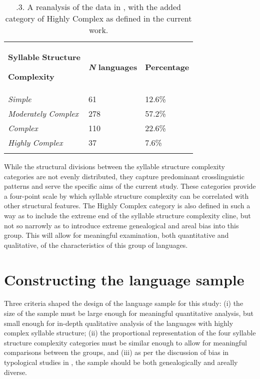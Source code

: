 \begin{table}
\begin{tabularx}{\textwidth}{XXX}
\lsptoprule

\textbf{Syllable} \textbf{Structure} 

\textbf{Complexity} & \textbf{\textit{N}} \textbf{languages} & \textbf{Percentage}\\
\textit{Simple} & 61 & 12.6\%\\
\textit{Moderately} \textit{Complex} & 278 & 57.2\%\\
\textit{Complex} & 110 & 22.6\%\\
\textit{Highly} \textit{Complex} & 37 & 7.6\%\\
\lspbottomrule
\end{tabularx}
\caption{\label{tab:key:2}.3. A reanalysis of the data in \citet{Maddieson2013a}, with the added category of Highly Complex as defined in the current work.}
\end{table}

  While the structural divisions between the syllable structure complexity categories are not evenly distributed, they capture predominant crosslinguistic patterns and serve the specific aims of the current study. These categories provide a four-point scale by which syllable structure complexity can be correlated with other structural features. The Highly Complex category is also defined in such a way as to include the extreme end of the syllable structure complexity cline, but not so narrowly as to introduce extreme genealogical and areal bias into this group. This will allow for meaningful examination, both quantitative and qualitative, of the characteristics of this group of languages.

\section{Constructing the language sample}\label{sec:2.3}

  Three criteria shaped the design of the language sample for this study: (i) the size of the sample must be large enough for meaningful quantitative analysis, but small enough for in-depth qualitative analysis of the languages with highly complex syllable structure; (ii) the proportional representation of the four syllable structure complexity categories must be similar enough to allow for meaningful comparisons between the groups, and (iii) as per the discussion of bias in typological studies in , the sample should be both genealogically and areally diverse.

